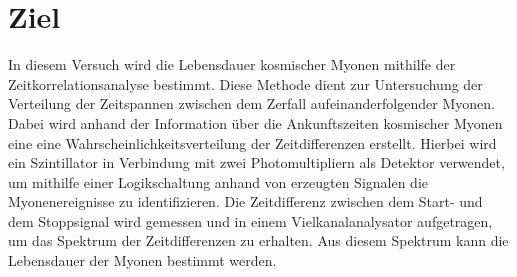 \section{Ziel}
\label{sec:Ziel}

In diesem Versuch wird die Lebensdauer kosmischer Myonen mithilfe der Zeitkorrelationsanalyse bestimmt.
Diese Methode dient zur Untersuchung der Verteilung der Zeitspannen zwischen dem
Zerfall aufeinanderfolgender Myonen.
Dabei wird anhand der Information über die Ankunftszeiten kosmischer Myonen
eine eine Wahrscheinlichkeitsverteilung der Zeitdifferenzen erstellt.
Hierbei wird ein Szintillator in Verbindung mit zwei Photomultipliern als Detektor verwendet,
um mithilfe einer Logikschaltung anhand von erzeugten Signalen die Myonenereignisse zu identifizieren.
Die Zeitdifferenz zwischen dem Start- und dem Stoppsignal wird gemessen und in einem Vielkanalanalysator aufgetragen, 
um das Spektrum der Zeitdifferenzen zu erhalten. 
Aus diesem Spektrum kann die Lebensdauer der Myonen bestimmt werden.